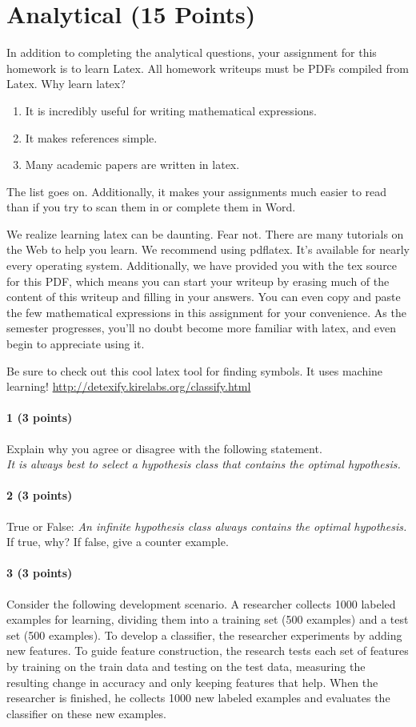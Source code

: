 \documentclass[11pt]{article}
\begin{document}
\section{Analytical (15 Points)}
In addition to completing the analytical questions, your assignment for this homework is to learn Latex. All homework writeups must be PDFs compiled from Latex. Why learn latex?
\begin{enumerate}
\item It is incredibly useful for writing mathematical expressions.
\item It makes references simple.
\item Many academic papers are written in latex.
\end{enumerate}
The list goes on. Additionally, it makes your assignments much easier to read than if you try to scan them in or complete them in Word.

We realize learning latex can be daunting. Fear not. There are many tutorials on the Web to help you learn. We recommend using pdflatex. It's available for nearly every operating system. Additionally, we have provided you with the tex source for this PDF, which means you can start your writeup by erasing much of the content of this writeup and filling in your answers. You can even copy and paste the few mathematical expressions in this assignment for your convenience. As the semester progresses, you'll no doubt become more familiar with latex, and even begin to appreciate using it.

Be sure to check out this cool latex tool for finding symbols. It uses machine learning! \url{http://detexify.kirelabs.org/classify.html}


\paragraph{1 (3 points)} Explain why you agree or disagree with the following statement.\\
{\it It is always best to select a hypothesis class that contains the optimal hypothesis.}

\paragraph{2 (3 points)} True or False: {\it An infinite hypothesis class always contains the optimal hypothesis.} If true, why? If false, give a counter example.

\paragraph{3 (3 points)} Consider the following development scenario. A researcher collects 1000 labeled examples for learning, dividing them into a training set (500 examples) and a test set (500 examples). To develop a classifier, the researcher experiments by adding new features. To guide feature construction, the research tests each set of features by training on the train data and testing on the test data, measuring the resulting change in accuracy and only keeping features that help. When the researcher is finished, he collects 1000 new labeled examples and evaluates the classifier on these new examples.
\end{document}
